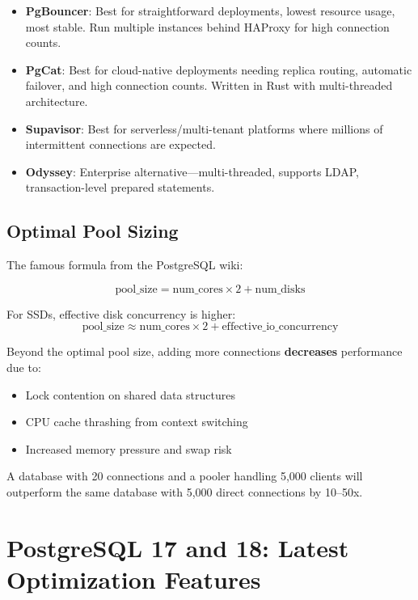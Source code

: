 \documentclass[12pt,a4paper]{article}
\begin{document}
\begin{tipbox}
\begin{itemize}
    \item \textbf{PgBouncer}: Best for straightforward deployments, lowest resource usage, most stable. Run multiple instances behind HAProxy for high connection counts.
    \item \textbf{PgCat}: Best for cloud-native deployments needing replica routing, automatic failover, and high connection counts. Written in Rust with multi-threaded architecture.
    \item \textbf{Supavisor}: Best for serverless/multi-tenant platforms where millions of intermittent connections are expected.
    \item \textbf{Odyssey}: Enterprise alternative---multi-threaded, supports LDAP, transaction-level prepared statements.
\end{itemize}
\end{tipbox}

\subsection{Optimal Pool Sizing}

The famous formula from the PostgreSQL wiki:

$$\text{pool\_size} = \text{num\_cores} \times 2 + \text{num\_disks}$$

For SSDs, effective disk concurrency is higher:
$$\text{pool\_size} \approx \text{num\_cores} \times 2 + \text{effective\_io\_concurrency}$$

\begin{warnbox}[The ``More Connections = Better'' Myth]
Beyond the optimal pool size, adding more connections \textbf{decreases} performance due to:
\begin{itemize}
    \item Lock contention on shared data structures
    \item CPU cache thrashing from context switching
    \item Increased memory pressure and swap risk
\end{itemize}
A database with 20 connections and a pooler handling 5,000 clients will outperform the same database with 5,000 direct connections by 10--50x.
\end{warnbox}


\section{PostgreSQL 17 and 18: Latest Optimization Features}
\end{document}
